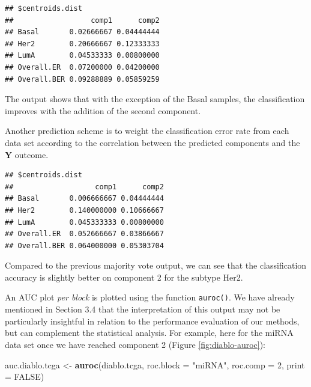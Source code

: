 \documentclass[]{book}
\newenvironment{Shaded}{\begin{snugshade}}{\end{snugshade}}
\newcommand{\CommentTok}[1]{\textcolor[rgb]{0.56,0.35,0.01}{\textit{#1}}}
\newcommand{\DataTypeTok}[1]{\textcolor[rgb]{0.13,0.29,0.53}{#1}}
\newcommand{\DecValTok}[1]{\textcolor[rgb]{0.00,0.00,0.81}{#1}}
\newcommand{\KeywordTok}[1]{\textcolor[rgb]{0.13,0.29,0.53}{\textbf{#1}}}
\newcommand{\NormalTok}[1]{#1}
\newcommand{\OperatorTok}[1]{\textcolor[rgb]{0.81,0.36,0.00}{\textbf{#1}}}
\newcommand{\OtherTok}[1]{\textcolor[rgb]{0.56,0.35,0.01}{#1}}
\newcommand{\StringTok}[1]{\textcolor[rgb]{0.31,0.60,0.02}{#1}}
\begin{document}
\begin{verbatim}
## $centroids.dist
##                  comp1      comp2
## Basal       0.02666667 0.04444444
## Her2        0.20666667 0.12333333
## LumA        0.04533333 0.00800000
## Overall.ER  0.07200000 0.04200000
## Overall.BER 0.09288889 0.05859259
\end{verbatim}

The output shows that with the exception of the Basal samples, the classification improves with the addition of the second component.

Another prediction scheme is to weight the classification error rate from each data set according to the correlation between the predicted components and the \(\boldsymbol Y\) outcome.

\begin{Shaded}
\end{Shaded}

\begin{verbatim}
## $centroids.dist
##                   comp1      comp2
## Basal       0.006666667 0.04444444
## Her2        0.140000000 0.10666667
## LumA        0.045333333 0.00800000
## Overall.ER  0.052666667 0.03866667
## Overall.BER 0.064000000 0.05303704
\end{verbatim}

Compared to the previous majority vote output, we can see that the classification accuracy is slightly better on component 2 for the subtype Her2.

An AUC plot \emph{per block} is plotted using the function \texttt{auroc()}. We have already mentioned in Section 3.4 that the interpretation of this output may not be particularly insightful in relation to the performance evaluation of our methods, but can complement the statistical analysis. For example, here for the miRNA data set once we have reached component 2 (Figure \ref{fig:diablo-auroc}):

\begin{Shaded}
\begin{Highlighting}[]
\NormalTok{auc.diablo.tcga <-}\StringTok{ }\KeywordTok{auroc}\NormalTok{(diablo.tcga, }\DataTypeTok{roc.block =} \StringTok{"miRNA"}\NormalTok{, }\DataTypeTok{roc.comp =} \DecValTok{2}\NormalTok{,}
                   \DataTypeTok{print =} \OtherTok{FALSE}\NormalTok{)}
\end{Highlighting}
\end{Shaded}
\end{document}
